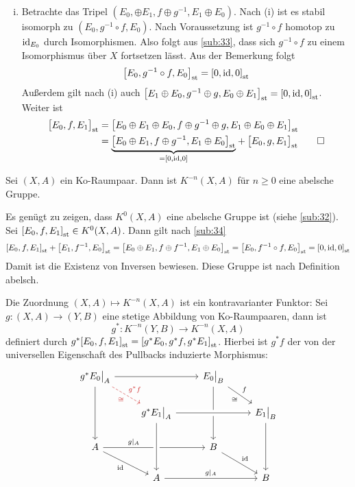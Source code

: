 \begin{beweis}
\begin{enumerate}[(i)]
	\item Betrachte das Tripel $(E_0, \oplus E_1, f \oplus g ^{-1}, E_1 \oplus E_0)$. Nach (i) ist es stabil isomorph zu $(E_0, g ^{-1}\circ f,E_0)$. Nach Voraussetzung ist
	$g ^{-1} \circ f$ homotop zu $\id_{E_0}$ durch Isomorphismen. Also folgt aus \autoref{sub:33}, dass sich $g ^{-1} \circ f$ zu einem Isomorphismus über $X$ fortsetzen 
	lässt. Aus der Bemerkung folgt 
	\begin{align*}
		\benbrace*{E_0, g ^{-1} \circ f,E_0}_\st = \benbrace*{0,\id,0}_\st 
	\end{align*}
	Außerdem gilt nach (i) auch $\benbrace*{E_1 \oplus E_0, g ^{-1} \oplus g, E_0 \oplus E_1}_\st = \benbrace*{0,\id,0}_\st$. Weiter ist
	\begin{align*}
		\benbrace[\big]{E_0,f,E_1}_\st &= \benbrace*{E_0 \oplus E_1 \oplus E_0, f \oplus g ^{-1} \oplus g, E_1 \oplus E_0 \oplus E_1}_\st \\  
		&= \Underbrace{\benbrace*{E_0 \oplus E_1, f \oplus g ^{-1}, E_1 \oplus E_0}_\st }{=\benbrace{0,\id,0}} + \benbrace[\big]{E_0,g,E_1}_\st \qedhere
	\end{align*}
\end{enumerate}
\end{beweis}


\begin{korollar}[label=sub:35,{name=[$K^{-n}(X,A)$ ist eine abelsche Gruppe]}]
Sei $(X,A)$ ein Ko-Raumpaar. Dann ist $K^{-n}(X,A)$ für $n \ge 0$ eine abelsche Gruppe.
\end{korollar}
\begin{beweis}
Es genügt zu zeigen, dass $K^0(X,A)$ eine abelsche Gruppe ist (siehe \autoref{sub:32}). Sei $\benbrace*{E_0, f,E_1}_\st\in K^0(X,A)$. Dann gilt nach \autoref{sub:34}
\begin{align*}
	\benbrace*{E_0,f,E_1}_\st + \benbrace*{E_1,f ^{-1},E_0}_\st = \benbrace*{E_0 \oplus E_1, f \oplus f ^{-1}, E_1 \oplus E_0}_\st = \benbrace*{E_0, f ^{-1} \circ f,E_0}_\st
	= \benbrace*{0,\id,0}_\st 
\end{align*}
Damit ist die Existenz von Inversen bewiesen. Diese Gruppe ist nach Definition abelsch.
\end{beweis}
Die Zuordnung $(X,A) \mapsto K^{-n}(X,A)$ ist ein kontravarianter Funktor: Sei $g \colon (X,A) \to (Y,B)$ eine stetige Abbildung von Ko-Raumpaaren, dann ist
\[
	g^* \colon K^{-n}(Y,B) \to K^{-n}(X,A)
\]
definiert durch $g^* \benbrace*{E_0,f,E_1}_\st = \benbrace*{g^* E_0, g^* f, g^* E_1}_\st$. Hierbei ist $g^* f$ der von der universellen Eigenschaft des Pullbacks induzierte 
Morphismus:
\[
	\begin{tikzcd}[thick]
		g^* E_0\big|_A \ar[rr] \ar[dd] \ar[dr,dashed,"g^* f","\cong"',Firebrick3] & & E_0\big|_B \drar["f","\cong"'] \ar[dd]\\
		& g^* E_1\big|_A \ar[rr,crossing over] & & E_1\big|_B \ar[dd]\\
		A \ar[rr,"g|_A",pos=0.3] \ar[dr,"\id"']& & B \ar[dr,"\id"]\\
		& A \ar[from=uu,crossing over] \ar[rr,"g|_A"]& & B
	\end{tikzcd}
\]	

